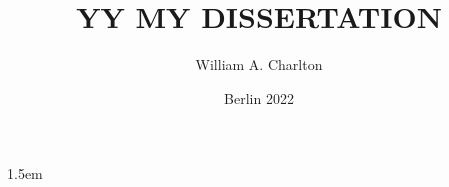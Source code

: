 

\newcommand*{\Title}{YY MY DISSERTATION}

\newcommand*{\Autor}{William A. Charlton}
\newcommand*{\Datum}{Berlin 2022}
\title{\Title}
\author{\Autor}
\date{\Datum}

\newcommand{\tfk}[1]{\textsl{\texttt{#1}}}
\newcommand{\fett}[1]{\textbf{#1}}
\newcommand{\kursiv}[1]{\textit{#1}}
\newcommand{\pbb}{\parbox}
\newcommand{\sst}{\scriptstyle}


\providecommand{\tightlist}{%
  \setlength{\itemsep}{0pt}\setlength{\parskip}{0pt}}

\def\umbruch{\clearpage}



\frenchspacing								%
\setlength{\parindent}{1.5ex}						%
\setlength{\parskip}{0.25ex plus0.25ex minus 0.25ex}	%



\emergencystretch 1.5em %
\hfuzz 0.3pt
\vfuzz \hfuzz
\raggedbottom
{}						%

